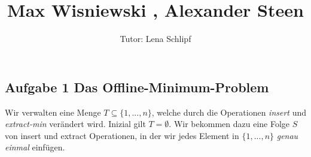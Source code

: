 \documentclass[11pt,a4paper,ngerman]{article}
\author{Tutor: Lena Schlipf}
\date{}
\title{Max Wisniewski , Alexander Steen}
\begin{document}

\maketitle
\thispagestyle{fancy}

\subsection*{Aufgabe 1 \mdseries Das Offline-Minimum-Problem}

Wir verwalten eine Menge $T \subseteq \{ 1, ... , n\}$, welche durch die Operationen \emph{insert} und \emph{extract-min} verändert wird. Inizial gilt $T=\emptyset$. Wir bekommen dazu eine Folge $S$ von insert und extract Operationen, in der wir jedes Element in $\{1,...,n\}$ \emph{genau einmal} einfügen.
\end{document}
